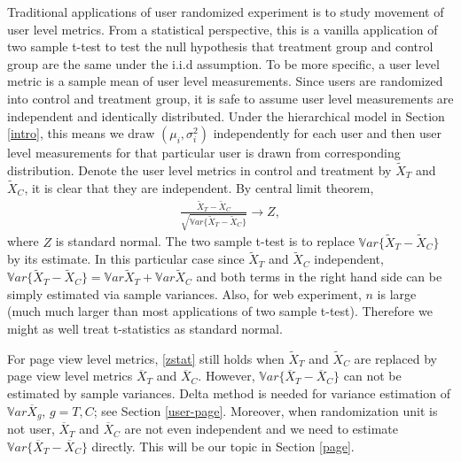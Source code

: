 \documentclass[11pt]{asaproc}
\newcommand{\wX}{\widetilde{X}}
\newcommand{\var}{\ensuremath{\mathbb Var}}
\newcommand{\xbar}{\overline{X}}
\begin{document}
Traditional applications of user randomized experiment is to study movement of user level metrics. From a statistical perspective, this is a vanilla application of two sample t-test to test the null hypothesis that treatment group and control group are the same under the i.i.d assumption. To be more specific, a user level metric is a sample mean of user level measurements. Since users are randomized into control and treatment group, it is safe to assume user level measurements are independent and identically distributed. Under the hierarchical model in Section \ref{intro}, this means we draw $(\mu_i, \sigma_i^2)$ independently for each user and then user level measurements for that particular user is drawn from corresponding distribution. Denote the user level metrics in control and treatment by $\wX_T$ and $\wX_C$, it is clear that they are independent. By central limit theorem,  
\begin{align}\label{zstat}
\frac{\wX_T - \wX_C}{\sqrt{\var \{\wX_T - \wX_C\}}} \to Z,
\end{align}
where $Z$ is standard normal. The two sample t-test is to replace $\var \{\wX_T - \wX_C\}$ by its estimate. In this particular case since $\wX_T$ and $\wX_C$ independent, $\var \{\wX_T - \wX_C\}= \var \wX_T + \var \wX_C$ and both terms in the right hand side can be simply estimated via sample variances. Also, for web experiment, $n$ is large (much much larger than most applications of two sample t-test). Therefore we might as well treat t-statistics as standard normal. 

For page view level metrics, \eqref{zstat} still holds when $\wX_T$ and $\wX_C$ are replaced by page view level metrics $\xbar_T$ and $\xbar_C$. However, $\var \{\xbar_T - \xbar_C\}$ can not be estimated by sample variances. Delta method is needed for variance estimation of $\var \xbar_g$, $g=T,C$; see Section \ref{user-page}. Moreover, when randomization unit is not user, $\xbar_T$ and $\xbar_C$ are not even independent and we need to estimate $\var \{\xbar_T - \xbar_C\}$ directly. This will be our topic in Section \ref{page}. 
\end{document}
